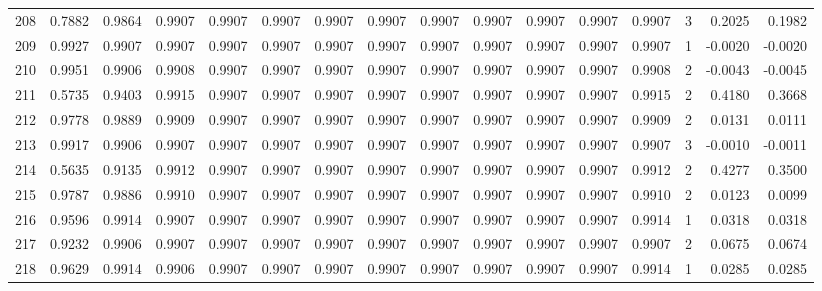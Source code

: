 \begin{tabular}{lrrrrrrrrrrrrrrr}
208 &      0.7882 &  0.9864 &  0.9907 &  0.9907 &  0.9907 &  0.9907 &  0.9907 &  0.9907 &  0.9907 &  0.9907 &   0.9907 &     0.9907 &      3 &                    0.2025 &                     0.1982 \\
209 &      0.9927 &  0.9907 &  0.9907 &  0.9907 &  0.9907 &  0.9907 &  0.9907 &  0.9907 &  0.9907 &  0.9907 &   0.9907 &     0.9907 &      1 &                   -0.0020 &                    -0.0020 \\
210 &      0.9951 &  0.9906 &  0.9908 &  0.9907 &  0.9907 &  0.9907 &  0.9907 &  0.9907 &  0.9907 &  0.9907 &   0.9907 &     0.9908 &      2 &                   -0.0043 &                    -0.0045 \\
211 &      0.5735 &  0.9403 &  0.9915 &  0.9907 &  0.9907 &  0.9907 &  0.9907 &  0.9907 &  0.9907 &  0.9907 &   0.9907 &     0.9915 &      2 &                    0.4180 &                     0.3668 \\
212 &      0.9778 &  0.9889 &  0.9909 &  0.9907 &  0.9907 &  0.9907 &  0.9907 &  0.9907 &  0.9907 &  0.9907 &   0.9907 &     0.9909 &      2 &                    0.0131 &                     0.0111 \\
213 &      0.9917 &  0.9906 &  0.9907 &  0.9907 &  0.9907 &  0.9907 &  0.9907 &  0.9907 &  0.9907 &  0.9907 &   0.9907 &     0.9907 &      3 &                   -0.0010 &                    -0.0011 \\
214 &      0.5635 &  0.9135 &  0.9912 &  0.9907 &  0.9907 &  0.9907 &  0.9907 &  0.9907 &  0.9907 &  0.9907 &   0.9907 &     0.9912 &      2 &                    0.4277 &                     0.3500 \\
215 &      0.9787 &  0.9886 &  0.9910 &  0.9907 &  0.9907 &  0.9907 &  0.9907 &  0.9907 &  0.9907 &  0.9907 &   0.9907 &     0.9910 &      2 &                    0.0123 &                     0.0099 \\
216 &      0.9596 &  0.9914 &  0.9907 &  0.9907 &  0.9907 &  0.9907 &  0.9907 &  0.9907 &  0.9907 &  0.9907 &   0.9907 &     0.9914 &      1 &                    0.0318 &                     0.0318 \\
217 &      0.9232 &  0.9906 &  0.9907 &  0.9907 &  0.9907 &  0.9907 &  0.9907 &  0.9907 &  0.9907 &  0.9907 &   0.9907 &     0.9907 &      2 &                    0.0675 &                     0.0674 \\
218 &      0.9629 &  0.9914 &  0.9906 &  0.9907 &  0.9907 &  0.9907 &  0.9907 &  0.9907 &  0.9907 &  0.9907 &   0.9907 &     0.9914 &      1 &                    0.0285 &                     0.0285 \\

\end{tabular}
